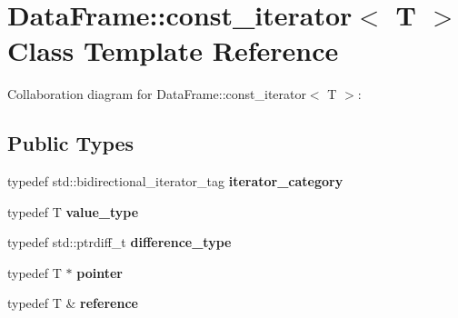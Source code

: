 \hypertarget{classDataFrame_1_1const__iterator}{}\section{Data\+Frame\+:\+:const\+\_\+iterator$<$ T $>$ Class Template Reference}
\label{classDataFrame_1_1const__iterator}


Collaboration diagram for Data\+Frame\+:\+:const\+\_\+iterator$<$ T $>$\+:
\subsection*{Public Types}
\begin{DoxyCompactItemize}
\item 
\mbox{\label{classDataFrame_1_1const__iterator_a8c833ed3ef4e3aecde4546e118eab3e8}} 
typedef std\+::bidirectional\+\_\+iterator\+\_\+tag {\bfseries iterator\+\_\+category}
\item 
\mbox{\label{classDataFrame_1_1const__iterator_a90eaeee2b3f2a14ab9dc2b94b1e5f24e}} 
typedef T {\bfseries value\+\_\+type}
\item 
\mbox{\label{classDataFrame_1_1const__iterator_a0383aae09ae9e5490cc055183c1c0809}} 
typedef std\+::ptrdiff\+\_\+t {\bfseries difference\+\_\+type}
\item 
\mbox{\label{classDataFrame_1_1const__iterator_a2416f1f16379bfa343357803144546e4}} 
typedef T $\ast$ {\bfseries pointer}
\item 
\mbox{\label{classDataFrame_1_1const__iterator_aa9727c44e9864c5de276f7935f0dd6b5}} 
typedef T \& {\bfseries reference}
\end{DoxyCompactItemize}
